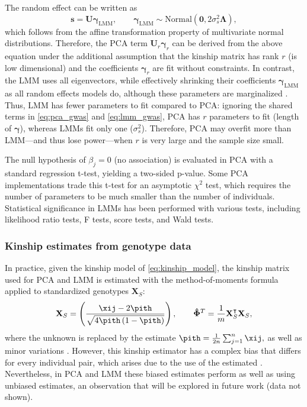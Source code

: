 \documentclass[11pt]{article}
\begin{document}
The random effect can be written as
$$
\mathbf{s} = \mathbf{U} \boldsymbol{\gamma}_\text{LMM},
\quad\quad
\boldsymbol{\gamma}_\text{LMM}
\sim \text{Normal}( \mathbf{0}, 2 \sigma_s^2 \boldsymbol{\Lambda})
,
$$
which follows from the affine transformation property of multivariate normal distributions.
Therefore, the PCA term $\mathbf{U}_r \boldsymbol{\gamma}_r$ can be derived from the above equation under the additional assumption that the kinship matrix has rank $r$ (is low dimensional) and the coefficients $\boldsymbol{\gamma}_r$ are fit without constraints.
In contrast, the LMM uses all eigenvectors, while effectively shrinking their coefficients $\boldsymbol{\gamma}_\text{LMM}$ as all random effects models do, although these parameters are marginalized \citep{astle_population_2009, hoffman_correcting_2013}.
Thus, LMM has fewer parameters to fit compared to PCA: ignoring the shared terms in \cref{eq:pca_gwas} and \cref{eq:lmm_gwas}, PCA has $r$ parameters to fit (length of $\boldsymbol{\gamma}$), whereas LMMs fit only one ($\sigma^2_s$).
Therefore, PCA may overfit more than LMM---and thus lose power---when $r$ is very large and the sample size small.

The null hypothesis of $\beta_j = 0$ (no association) is evaluated in PCA with a standard regression t-test, yielding a two-sided p-value.
Some PCA implementations trade this t-test for an asymptotic $\chi^2$ test, which requires the number of parameters to be much smaller than the number of individuals.
Statistical significance in LMMs has been performed with various tests, including likelihood ratio tests, F tests, score tests, and Wald tests.

\subsubsection{Kinship estimates from genotype data}

In practice, given the kinship model of \cref{eq:kinship_model}, the kinship matrix used for PCA and LMM is estimated with the method-of-moments formula applied to standardized genotypes $\mathbf{X}_S$:
\begin{equation}
  \label{eq:kinship_std}
  \mathbf{X}_S
  =
  \left(
    \frac{
      \xij - 2 \pith
    }{
      \sqrt{4 \pith \left( 1 - \pith \right)}
    }
  \right)
  ,
  \quad\quad
  \mathbf{\hat{\Phi}}^T
  =
  \frac{1}{m}
  \mathbf{X}_S^\intercal
  \mathbf{X}_S
  ,
\end{equation}
where the unknown \pit is replaced by the estimate
$
\pith = \frac{1}{2n} \sum_{j = 1}^n \xij,
$
as well as minor variations \citep{price_principal_2006, kang_efficient_2008, kang_variance_2010, yang_gcta:_2011, zhou_genome-wide_2012, loh_efficient_2015, sul_population_2018, zhou_efficiently_2018}.
However, this kinship estimator has a complex bias that differs for every individual pair, which arises due to the use of the estimated \pith \citep{ochoa_estimating_2021, ochoa_human}.
Nevertheless, in PCA and LMM these biased estimates perform as well as using unbiased estimates, an observation that will be explored in future work (data not shown).
\end{document}
